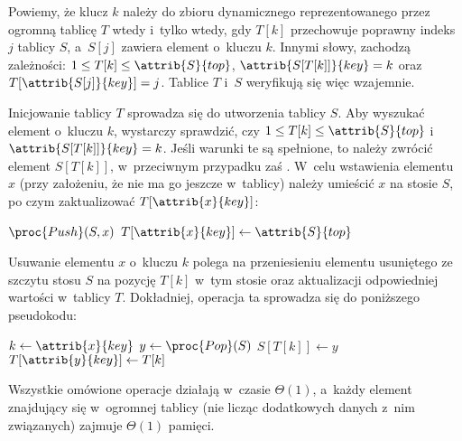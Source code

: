 Powiemy, że klucz $k$ należy do zbioru dynamicznego reprezentowanego przez ogromną tablicę $T$ wtedy i~tylko wtedy, gdy $T[k]$ przechowuje poprawny indeks $j$ tablicy $S$, a~$S[j]$ zawiera element o~kluczu $k$.
Innymi słowy, zachodzą zależności: $1\le T[k]\le\attrib{S}{top}$, $\attrib{S[T[k]]}{key}=k$ oraz $T[\attrib{S[j]}{key}]=j$.
Tablice $T$ i~$S$ weryfikują się więc wzajemnie.

Inicjowanie tablicy $T$ sprowadza się do utworzenia tablicy $S$.
Aby wyszukać element o~kluczu $k$, wystarczy sprawdzić, czy $1\le T[k]\le\attrib{S}{top}$ i~$\attrib{S[T[k]]}{key}=k$.
Jeśli warunki te są spełnione, to należy zwrócić element $S[T[k]]$, w~przeciwnym przypadku zaś .
W~celu wstawienia elementu $x$ (przy założeniu, że nie ma go jeszcze w~tablicy) należy umieścić $x$ na stosie $S$, po czym zaktualizować $T[\attrib{x}{key}]$:
\begin{codebox}
\li	$\proc{Push}(S,x)$
\li	$T[\attrib{x}{key}]\gets\attrib{S}{top}$
\end{codebox}
Usuwanie elementu $x$ o~kluczu $k$ polega na przeniesieniu elementu usuniętego ze szczytu stosu $S$ na pozycję $T[k]$ w~tym stosie oraz aktualizacji odpowiedniej wartości w~tablicy $T$.
Dokładniej, operacja ta sprowadza się do poniższego pseudokodu:
\begin{codebox}
\li	$k\gets\attrib{x}{key}$
\li	$y\gets\proc{Pop}(S)$
\li	$S[T[k]]\gets y$
\li	$T[\attrib{y}{key}]\gets T[k]$
\end{codebox}

Wszystkie omówione operacje działają w~czasie $\Theta(1)$, a~każdy element znajdujący się w~ogromnej tablicy (nie licząc dodatkowych danych z~nim związanych) zajmuje $\Theta(1)$ pamięci.
